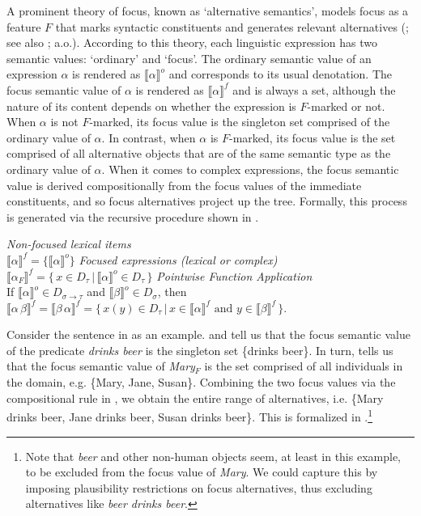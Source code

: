 \documentclass[output=paper,colorlinks,citecolor=brown]{langscibook}
\begin{document}
A prominent theory of focus, known as `alternative semantics', models focus as a feature $F$ that marks syntactic constituents and generates relevant alternatives (\citealt{Rooth1985, Rooth1992, Rooth1997}; see also \citealt{Jackendoff1972, Hamblin1973, Kratzer1991b, Selkirk1995, Schwarzschild1999, Beaver2008, Buring2019}; a.o.). According to this theory, each linguistic expression has two semantic values: `ordinary' and `focus'. The ordinary semantic value of an expression $\alpha$ is rendered as $\llbracket \alpha \rrbracket^{o}$ and corresponds to its usual denotation. The focus semantic value of $\alpha$ is rendered as $\llbracket \alpha \rrbracket^{f}$ and is always a set, although the nature of its content depends on whether the expression is $F$-marked or not. When $\alpha$ is not $F$-marked, its focus value is the singleton set comprised of the ordinary value of $\alpha$. In contrast, when $\alpha$ is $F$-marked, its focus value is the set comprised of all alternative objects that are of the same semantic type as the ordinary value of $\alpha$. When it comes to complex expressions, the focus semantic value is derived compositionally from the focus values of the immediate constituents, and so focus alternatives project up the tree. Formally, this process is generated via the recursive procedure shown in .

\is{}
\ea \label{Foc.Lex} 
    \ea \textit{Non-focused lexical items} \\ $\llbracket \alpha \rrbracket^{f} = \{  \llbracket \alpha \rrbracket^{o} \}$\label{Foc.Lex.NFoc}
    \ex \textit{Focused expressions (lexical or complex)} \\ $ \llbracket  \alpha _{F} \rrbracket^{f} =  \{ \, x \in {D}_{\tau} \, | \, \llbracket \alpha {\rrbracket}^{o} \in {D}_{\tau} \, \} $\label{Foc.Lex.Foc}
    \z
\ex \textit{Pointwise Function Application} \\
		If $\llbracket \alpha \rrbracket^{o} \in {D}_{\sigma \to \tau}$  and  $\llbracket \beta {\rrbracket}^{o} \in {D}_{\sigma}$, then ${ \llbracket  \alpha \,\beta  \rrbracket^{f}} = { \llbracket  \beta \,\alpha \rrbracket^{f}} = \{ \,x(y) \in {D_\tau } \, | \, x \in { \llbracket \alpha \rrbracket^{f}}{\text{ and }}y \in { \llbracket \beta  \rrbracket^{f}}\,\} $.\label{FA}
\z
\il{}

Consider the sentence in  as an example.  and  tell us that the focus semantic value of the predicate \textit{drinks beer} is the singleton set \{drinks beer\}. In turn,  tells us that the focus semantic value of \textit{Mary}$_F$ is the set comprised of all individuals in the domain, e.g. \{Mary, Jane, Susan\}. Combining the two focus values via the compositional rule in , we obtain the entire range of alternatives, i.e. \{Mary drinks beer, Jane drinks beer, Susan drinks beer\}. This is formalized in .\footnote{Note that \textit{beer} and other non-human objects seem, at least in this example, to be excluded from the focus value of \textit{Mary}. We could capture this by imposing plausibility restrictions on focus alternatives, thus excluding alternatives like \textit{beer drinks beer}.} 
\end{document}
